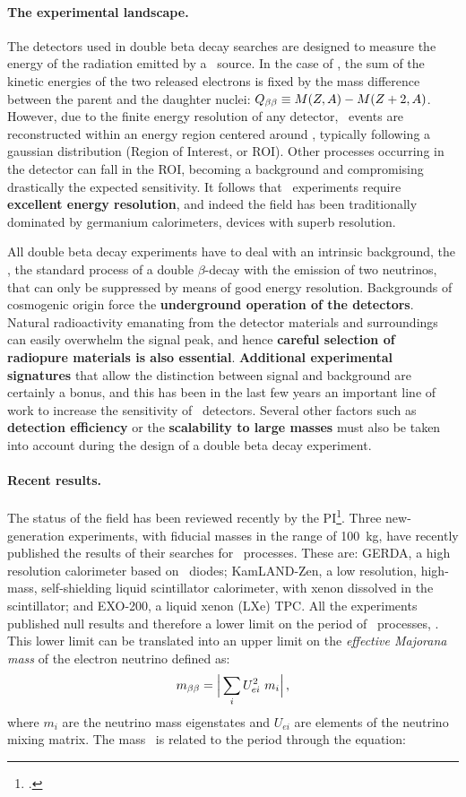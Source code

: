 \paragraph{The experimental landscape.}
The detectors used in double beta decay searches are designed to measure the energy of the radiation emitted by a \bb\ source. In the case of \bbonu, the sum of the kinetic energies of the two released electrons is fixed by the mass difference between the parent and the daughter nuclei: $Q_{\beta\beta} \equiv M(Z,A)-M(Z+2,A)$. However, due to the finite energy resolution of any detector, \bbonu\ events are reconstructed within an energy region centered around \Qbb, typically following a gaussian distribution (Region of Interest, or ROI). Other processes occurring in the detector can fall in the ROI, becoming a background and compromising drastically the expected sensitivity. It follows that \bbonu\ experiments require {\bf excellent energy resolution}, and indeed the field has been traditionally dominated by germanium calorimeters, devices with superb resolution.

All double beta decay experiments have to deal with an intrinsic background, the \bbtnu, the standard process of a double $\beta$-decay with the emission of two neutrinos, that can only be suppressed by means of good energy resolution. Backgrounds of cosmogenic origin force the {\bf underground operation of the detectors}. Natural radioactivity emanating from the detector materials and surroundings can easily overwhelm the signal peak, and hence {\bf careful selection of radiopure materials is also essential}. {\bf Additional experimental signatures} that allow the distinction between signal and background are certainly a bonus, and this has been in the last few years an important line of work to increase the sensitivity of \bbonu\ detectors. Several other factors such as {\bf detection efficiency} or the {\bf scalability to large masses} must also be taken into account during the design of a double beta decay experiment.
 
 \paragraph{Recent results.}
 The status of the field has been reviewed recently by the PI\footcite{INSS2014}. Three new-generation experiments, with fiducial masses in the range of 100~kg, have recently published the results of their searches for \bbonu\ processes. These are: GERDA, a high resolution calorimeter based on \GE\ diodes; KamLAND-Zen, a low resolution, high-mass, self-shielding liquid scintillator calorimeter, with xenon dissolved in the scintillator; and EXO-200, a liquid xenon (LXe) TPC. All the experiments published null results and therefore a lower limit on the period of \bbonu\ processes, \Tonu. This lower limit can be translated into an upper limit on the \emph{effective Majorana mass} of the electron neutrino defined as:
\begin{equation}
m_{\beta\beta} = \Big| \sum_{i} U^{2}_{ei} \ m_{i} \Big| \, ,
\end{equation}
%
where $m_{i}$ are the neutrino mass eigenstates and $U_{ei}$ are elements of the neutrino mixing matrix. The mass \mbb\ is related to the period through the equation:

